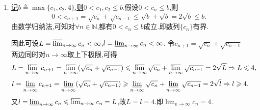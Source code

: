 \documentclass[../../main.tex]{subfiles}%
\begin{document}
\begin{solution}
\begin{enumerate}
\item \hyperref[example3.23-1]{记\(b\triangleq\max\{c_1,c_2,4\}\),则\(0 < c_1,c_2\leqslant b\)}.假设\(0 < c_n\leqslant b\),则
\[
0 < c_{n + 1}=\sqrt{c_n}+\sqrt{c_{n - 1}}\leqslant\sqrt{b}+\sqrt{b}=2\sqrt{b}\leqslant b.
\]
由数学归纳法,可知对\(\forall n\in\mathbb{N}\),都有\(0 < c_n\leqslant b\)成立.即数列\(\{c_n\}\)有界.

因此可设\(L=\varlimsup_{n\rightarrow\infty}c_n <\infty\),\(l=\varliminf_{n\rightarrow\infty}c_n <\infty\).
令\(c_{n + 1}=\sqrt{c_n}+\sqrt{c_{n - 1}}\)两边同时对\(n\rightarrow\infty\)取上下极限,可得
\[
L=\varlimsup_{n\rightarrow\infty}c_{n + 1}=\varlimsup_{n\rightarrow\infty}(\sqrt{c_n}+\sqrt{c_{n - 1}})\leqslant\varlimsup_{n\rightarrow\infty}\sqrt{c_n}+\varlimsup_{n\rightarrow\infty}\sqrt{c_{n - 1}}=2\sqrt{L}\Rightarrow L\leqslant 4,
\]
\[
l=\varliminf_{n\rightarrow\infty}c_{n + 1}=\varliminf_{n\rightarrow\infty}(\sqrt{c_n}+\sqrt{c_{n - 1}})\geqslant\varliminf_{n\rightarrow\infty}\sqrt{c_n}+\varliminf_{n\rightarrow\infty}\sqrt{c_{n - 1}}=2\sqrt{l}\Rightarrow l\geqslant 4.
\]
又\(l=\varliminf_{n\rightarrow\infty}c_n\leqslant\varlimsup_{n\rightarrow\infty}c_n = L\),故\(L = l = 4\).即\(\lim_{n\rightarrow\infty}c_n = 4\).


\end{enumerate}
\end{solution}
\end{document}
